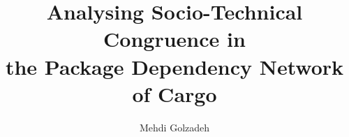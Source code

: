 




\renewcommand\footnotetextcopyrightpermission[1]{} %
\pagestyle{plain}

\usepackage{amssymb}%
\usepackage{pifont}%

\newcommand{\commentty}[1]{{\color{blue} \sf (TY: #1)}}
\newcommand{\commentlh}[1]{{\color{red} \sf (LH: #1)}}

\def\BibTeX{{\rm B\kern-.05em{\sc i\kern-.025em b}\kern-.08em
		T\kern-.1667em\lower.7ex\hbox{E}\kern-.125emX}}




	
\title{Analysing Socio-Technical Congruence in\\ the Package Dependency Network of Cargo}

	\author{Mehdi Golzadeh}
	
	\newcommand*{\Scale}[2][4]{\scalebox{#1}{$#2$}}%
	\newcommand{\Tool}{ComAir\xspace}
	\newcommand{\ComBugs}{30\xspace}
	
	
	
	
	
	
\maketitle
	






\newpage







